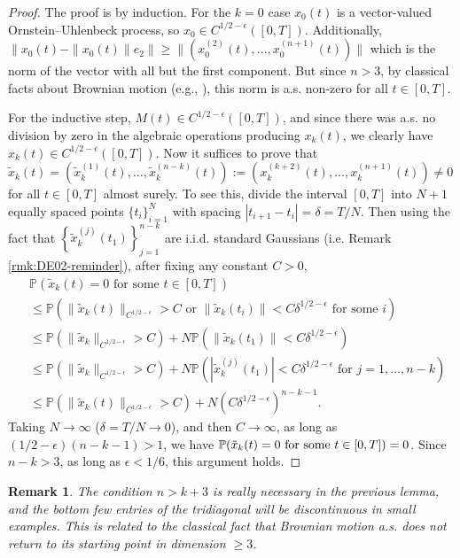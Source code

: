 \documentclass{amsart}
\newtheorem{rmk}[thm]{Remark}
\numberwithin{equation}{section}
\newcommand{\pr}{\mathbb{P}}
\begin{document}
\begin{proof}
    The proof is by induction. For the $k=0$ case $x_0(t)$ is a vector-valued Ornstein--Uhlenbeck process, so $x_0 \in C^{1/2-\epsilon}([0,T])$. Additionally, $\|x_0(t)-\|x_0(t)\|e_{2}\| \geq \|(x_0^{(2)}(t),...,x_0^{(n+1)}(t))\|$ which is the norm of the vector with all but the first component. But since $n>3$, by classical facts about Brownian motion (e.g., \cite{gall2016brownian}), this norm is a.s. non-zero for all $t \in [0,T]$.
    
    For the inductive step, $M(t)\in C^{1/2-\epsilon}([0,T])$, and since there was a.s. no division by zero in the algebraic operations producing $x_k(t)$, we clearly have $x_k(t) \in C^{1/2-\epsilon}([0,T])$. Now it suffices to prove that $\tilde{x}_k(t)=(\tilde{x}_k^{(1)}(t),...,\tilde{x}_k^{(n-k)}(t)):=(x_k^{(k+2)}(t),...,x_k^{(n+1)}(t)) \neq 0$ for all $t \in [0,T]$ almost surely. To see this, divide the interval $[0,T]$ into $N+1$ equally spaced points $\{t_i\}_{i=1}^{N}$ with spacing $|t_{i+1}-t_i|=\delta=T/N$. Then using the fact that $\left\{\tilde{x}_k^{(j)}(t_1)\right\}_{j=1}^{n-k}$ are i.i.d. standard Gaussians (i.e. Remark \ref{rmk:DE02-reminder}), after fixing any constant $C>0$,
    \begin{equation}
        \begin{split}
            ~&\pr(\tilde{x}_k(t) = 0 \text{ for some } t \in [0,T])\\
            &\leq \pr\left(\|\tilde{x}_k(t)\|_{C^{1/2-\epsilon}} >C \text{ or } \|\tilde{x}_k(t_i)\| < C\delta^{1/2-\epsilon} \text{ for some } i\right)\\
            &\leq \pr(\|\tilde{x}_k\|_{C^{1/2-\epsilon}} >C) +N \pr(\|\tilde{x}_k(t_1)\| < C\delta^{1/2-\epsilon})\\
            &\leq \pr(\|\tilde{x}_k\|_{C^{1/2-\epsilon}} >C) +N \pr(|\tilde{x}_k^{(j)}(t_1)| < C\delta^{1/2-\epsilon}\text{ for } j=1,\dots,n-k)\\
            &\leq \pr(\|\tilde{x}_k(t)\|_{C^{1/2-\epsilon}} >C) +N (C\delta^{1/2-\epsilon})^{n-k-1}.
        \end{split}
    \end{equation}
    Taking $N \to \infty$ ($\delta = T/N \to 0$), and then $C \to \infty$, as long as $(1/2-\epsilon)(n-k-1)>1$, we have $\pr(\Tilde{x}_k(t) = 0 \text{ for some } t \in [0,T])=0$. Since $n-k>3$, as long as $\epsilon < 1/6$, this argument holds. 
\end{proof}

\begin{rmk}
    The condition $n>k+3$ is really necessary in the previous lemma, and the bottom few entries of the tridiagonal will be discontinuous in small examples. This is related to the classical fact that Brownian motion a.s. does not return to its starting point in dimension $\geq 3$.
\end{rmk}
\end{document}
